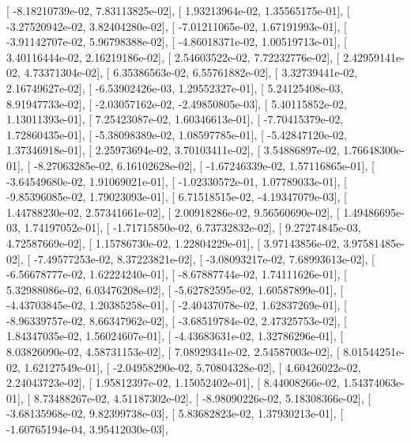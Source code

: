 \documentclass{article}
\begin{document}
       [ -8.18210739e-02,   7.83113825e-02],
       [  1.93213964e-02,   1.35565175e-01],
       [ -3.27520942e-02,   3.82404280e-02],
       [ -7.01211065e-02,   1.67191993e-01],
       [ -3.91142707e-02,   5.96798388e-02],
       [ -4.86018371e-02,   1.00519713e-01],
       [  3.40116444e-02,   2.16219186e-02],
       [  2.54603522e-02,   7.72232776e-02],
       [  2.42959141e-02,   4.73371304e-02],
       [  6.35386563e-02,   6.55761882e-02],
       [  3.32739441e-02,   2.16749627e-02],
       [ -6.53902426e-03,   1.29552327e-01],
       [  5.24125408e-03,   8.91947733e-02],
       [ -2.03057162e-02,  -2.49850805e-03],
       [  5.40115852e-02,   1.13011393e-01],
       [  7.25423087e-02,   1.60346613e-01],
       [ -7.70415379e-02,   1.72860435e-01],
       [ -5.38098389e-02,   1.08597785e-01],
       [ -5.42847120e-02,   1.37346918e-01],
       [  2.25973694e-02,   3.70103411e-02],
       [  3.54886897e-02,   1.76648300e-01],
       [ -8.27063285e-02,   6.16102628e-02],
       [ -1.67246339e-02,   1.57116865e-01],
       [ -3.64549680e-02,   1.91069021e-01],
       [ -1.02330572e-01,   1.07789033e-01],
       [ -9.85396085e-02,   1.79023093e-01],
       [  6.71518515e-02,  -4.19347079e-03],
       [  1.44788230e-02,   2.57341661e-02],
       [  2.00918286e-02,   9.56560690e-02],
       [  1.49486695e-03,   1.74197052e-01],
       [ -1.71715850e-02,   6.73732832e-02],
       [  9.27274845e-03,   4.72587669e-02],
       [  1.15786730e-02,   1.22804229e-01],
       [  3.97143856e-02,   3.97581485e-02],
       [ -7.49577253e-02,   8.37223821e-02],
       [ -3.08093217e-02,   7.68993613e-02],
       [ -6.56678777e-02,   1.62224240e-01],
       [ -8.67887744e-02,   1.74111626e-01],
       [  5.32988086e-02,   6.03476208e-02],
       [ -5.62782595e-02,   1.60587899e-01],
       [ -4.43703845e-02,   1.20385258e-01],
       [ -2.40437078e-02,   1.62837269e-01],
       [ -8.96339757e-02,   8.66347962e-02],
       [ -3.68519784e-02,   2.47325753e-02],
       [  1.84347035e-02,   1.56024607e-01],
       [ -4.43683631e-02,   1.32786296e-01],
       [  8.03826090e-02,   4.58731153e-02],
       [  7.08929341e-02,   2.54587003e-02],
       [  8.01544251e-02,   1.62127549e-01],
       [ -2.04958290e-02,   5.70804328e-02],
       [  4.60426022e-02,   2.24043723e-02],
       [  1.95812397e-02,   1.15052402e-01],
       [  8.44008266e-02,   1.54374063e-01],
       [  8.73488267e-02,   4.51187302e-02],
       [ -8.98090226e-02,   5.18308366e-02],
       [ -3.68135968e-02,   9.82399738e-03],
       [  5.83682823e-02,   1.37930213e-01],
       [ -1.60765194e-04,   3.95412030e-03],
\end{document}
